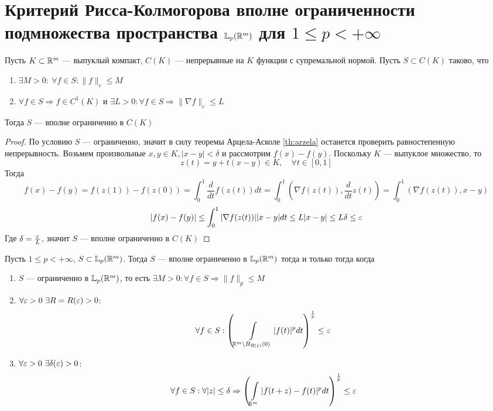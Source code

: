 \newpage
\section{Критерий Рисса-Колмогорова вполне ограниченности подмножества пространства $\mathbb{L}_p(\mathbb{R}^m)$ для $1 \leq p < +\infty$}

\begin{claim}
	Пусть $K \subset \mathbb{R}^m$ --- выпуклый компакт, $C(K)$ --- непрерывные на $K$ функции с супремальной нормой. Пусть $S \subset C(K)$ таково, что 
	\begin{enumerate}
		\item $\exists M > 0: \ \forall f \in S :  \|f\|_c \leq M$
		\item $\forall f \in S \Rightarrow f \in C^1(K)$ и $\exists L > 0: \forall f \in S \Rightarrow \|\nabla f \|_c \leq L$
	\end{enumerate}
	Тогда $S$ --- вполне ограниченно в $C(K)$
\end{claim}
\begin{proof}
	По условию $S$ --- ограниченно, значит в силу теоремы Арцела-Асколе \ref{th:arzela} останется проверить равностепенную непрерывность. Возьмем произвольные $x,y \in K, |x-y| < \delta$ и рассмотрим $f(x) - f(y)$. Поскольку $K$ --- выпуклое множество, то 
	$$
	z(t) = y + t(x-y) \in K, \quad \forall t \in [0,1]
	$$
	Тогда 
	$$
	f(x) - f(y) = f(z(1)) - f(z(0)) = \int_{0}^{1} \frac{d}{dt}f(z(t))dt = \int_{0}^{1}\left(\nabla f(z(t)), \frac{d}{dt}z(t)\right) = \int_{0}^1(\nabla f(z(t)), x - y)
	$$
	$$
	|f(x)-f(y)| \leq \int_{0}^1|\nabla f(z(t))| |x-y| dt \leq L|x-y| \leq L\delta \leq \varepsilon
	$$
	Где $\delta = \frac{\varepsilon}{L}$, значит $S$ --- вполне ограниченно в $C(K)$
\end{proof}
\begin{theorem}
	Пусть $1 \leq p < +\infty$, $S \subset \mathbb{L}_p(\mathbb{R}^m)$. Тогда $S$ --- вполне ограниченно в $\mathbb{L}_p(\mathbb{R}^m)$ тогда и только тогда когда
	\begin{enumerate}
		\item $S$ --- ограниченно в $\mathbb{L}_p(\mathbb{R}^m)$, то есть $\exists M > 0: \forall f \in S \Rightarrow \|f\|_p \leq M$
		\item $\forall \varepsilon > 0 \ \exists R = R(\varepsilon) > 0$: 
		$$
		\forall f \in S: \left(\int\limits_{\mathbb{R}^m \setminus B_{R(\varepsilon)}(0)} |f(t)|^pdt\right)^\frac{1}{p} \leq \varepsilon
		$$
		\item $\forall \varepsilon > 0 \ \exists \delta(\varepsilon) > 0$:
		$$
		\forall f \in S : \forall |z| \leq \delta \Rightarrow \left(\int\limits_{\mathbb{R}^m} |f(t + z) - f(t)|^p dt\right)^\frac{1}{p}  \leq \varepsilon
		$$
	\end{enumerate}
\end{theorem}
